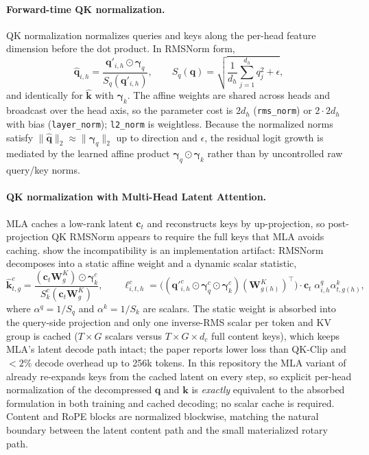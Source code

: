 \paragraph{Forward-time QK normalization.}
QK normalization \citep{henry2020querykey} normalizes queries and keys along the per-head feature dimension before the dot product. In RMSNorm form,
\[
\hat{\mathbf{q}}_{i,h} = \frac{\mathbf{q}'_{i,h}\odot\boldsymbol{\gamma}_q}{S_q(\mathbf{q}'_{i,h})},\qquad
S_q(\mathbf{q}) = \sqrt{\frac{1}{d_h}\sum_{j=1}^{d_h} q_j^2 + \epsilon},
\]
and identically for $\hat{\mathbf{k}}$ with $\boldsymbol{\gamma}_k$. The affine weights are shared across heads and broadcast over the head axis, so the parameter cost is $2d_h$ (\texttt{rms\_norm}) or $2\cdot 2d_h$ with bias (\texttt{layer\_norm}); \texttt{l2\_norm} is weightless. Because the normalized norms satisfy $\|\hat{\mathbf{q}}\|_2 \approx \|\boldsymbol{\gamma}_q\|_2$ up to direction and $\epsilon$, the residual logit growth is mediated by the learned affine product $\boldsymbol{\gamma}_q\odot\boldsymbol{\gamma}_k$ rather than by uncontrolled raw query/key norms.

\paragraph{QK normalization with Multi-Head Latent Attention.}
MLA caches a low-rank latent $\mathbf{c}_t$ and reconstructs keys by up-projection, so post-projection QK RMSNorm appears to require the full keys that MLA avoids caching. \citet{han2026qknormed} show the incompatibility is an implementation artifact: RMSNorm decomposes into a static affine weight and a dynamic scalar statistic,
\[
\hat{\mathbf{k}}^c_{t,g}=\frac{(\mathbf{c}_t\mathbf{W}^K_g)\odot\boldsymbol{\gamma}^c_k}{S^c_k(\mathbf{c}_t\mathbf{W}^K_g)},\qquad
\ell^c_{i,t,h}=\big((\mathbf{q}'^{c}_{i,h}\odot\boldsymbol{\gamma}^c_q\odot\boldsymbol{\gamma}^c_k)(\mathbf{W}^K_{g(h)})^\top\big)\cdot\mathbf{c}_t\;\alpha^q_{i,h}\alpha^k_{t,g(h)},
\]
where $\alpha^q=1/S_q$ and $\alpha^k=1/S_k$ are scalars. The static weight is absorbed into the query-side projection and only one inverse-RMS scalar per token and KV group is cached ($T\times G$ scalars versus $T\times G\times d_c$ full content keys), which keeps MLA's latent decode path intact; the paper reports lower loss than QK-Clip and $<2\%$ decode overhead up to 256k tokens. In this repository the MLA variant of \citet{mehta_mla_2025} already re-expands keys from the cached latent on every step, so explicit per-head normalization of the decompressed $\mathbf{q}$ and $\mathbf{k}$ is \emph{exactly} equivalent to the absorbed formulation in both training and cached decoding; no scalar cache is required. Content and RoPE blocks are normalized blockwise, matching the natural boundary between the latent content path and the small materialized rotary path.

